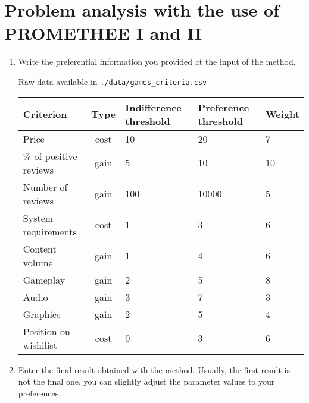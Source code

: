 \documentclass{article}
\begin{document}

\clearpage

\section{Problem analysis with the use of PROMETHEE I and II}

\begin{enumerate}

    \item Write the preferential information you provided at the input of the method.

    Raw data available in \verb|./data/games_criteria.csv|

    \begin{center}
    \begin{tabular}{l|c|m{6em}|m{6em}|l}
    Criterion & Type & Indifference threshold & Preference threshold & Weight \\
    \hline
    \hline
    Price & cost & 10 & 20 & 7 \\
    \% of positive reviews & gain & 5 & 10 & 10 \\
    Number of reviews & gain & 100 & 10000 & 5 \\
    System requirements & cost & 1 & 3 & 6 \\
    Content volume & gain & 1 & 4 & 6 \\
    Gameplay & gain & 2 & 5 & 8 \\
    Audio & gain & 3 & 7 & 3 \\
    Graphics & gain & 2 & 5 & 4 \\
    Position on wishilist & cost & 0 & 3 & 6 \\

    \end{tabular}
    \end{center}

    \item Enter the final result obtained with the method. Usually, the first result is not the final one, you can
    slightly adjust the parameter values to your preferences.

    

\end{enumerate}
\end{document}
